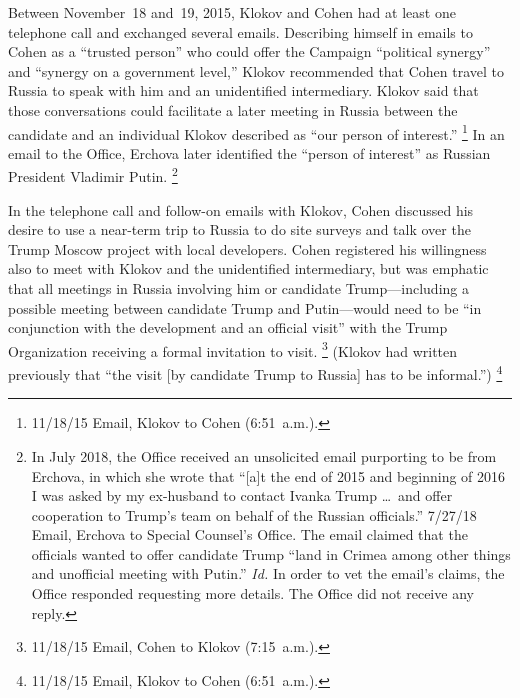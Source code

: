 Between November~18 and~19, 2015, Klokov and Cohen had at least one telephone call and exchanged several emails.
Describing himself in emails to Cohen as a ``trusted person'' who could offer the Campaign ``political synergy'' and ``synergy on a government level,'' Klokov recommended that Cohen travel to Russia to speak with him and an unidentified intermediary.
Klokov said that those conversations could facilitate a later meeting in Russia between the candidate and an individual Klokov described as ``our person of interest.''%
\footnote{11/18/15 Email, Klokov to Cohen (6:51~a.m.).}
In an email to the Office, Erchova later identified the ``person of interest'' as Russian President Vladimir Putin.%
\footnote{In July 2018, the Office received an unsolicited email purporting to be from Erchova, in which she wrote that ``[a]t the end of 2015 and beginning of 2016 I was asked by my ex-husband to contact Ivanka Trump \dots\ and offer cooperation to Trump's team on behalf of the Russian officials.''
7/27/18 Email, Erchova to Special Counsel's Office.
The email claimed that the officials wanted to offer candidate Trump ``land in Crimea among other things and unofficial meeting with Putin.''
\textit{Id.}
In order to vet the email's claims, the Office responded requesting more details.
The Office did not receive any reply.}

In the telephone call and follow-on emails with Klokov, Cohen discussed his desire to use a near-term trip to Russia to do site surveys and talk over the Trump Moscow project with local developers.
Cohen registered his willingness also to meet with Klokov and the unidentified intermediary, but was emphatic that all meetings in Russia involving him or candidate Trump---including a possible meeting between candidate Trump and Putin---would need to be ``in conjunction with the development and an official visit'' with the Trump Organization receiving a formal invitation to visit.%
\footnote{11/18/15 Email, Cohen to Klokov (7:15~a.m.).}
(Klokov had written previously that ``the visit [by candidate Trump to Russia] has to be informal.'')%
\footnote{11/18/15 Email, Klokov to Cohen (6:51~a.m.).}


